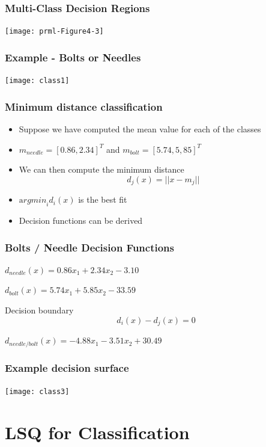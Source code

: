 \documentclass[10pt]{beamer}
\begin{document}
\begin{frame}
  \frametitle{Multi-Class Decision Regions}
  \begin{center}
    \texttt{[image: prml-Figure4-3]}
  \end{center}
\end{frame}


\begin{frame}
  \frametitle{Example - Bolts or Needles}
  \begin{center}
    \texttt{[image: class1]}
  \end{center}
\end{frame}

\begin{frame}
  \frametitle{Minimum distance classification}
  \begin{itemize}
  \item Suppose we have computed the mean value for each of the classes
  \item $m_{needle} = [0.86, 2.34]^T$ and $m_{bolt} = [5.74, 5,85]^T$
  \item We can then compute the minimum distance
    \[ d_j(x) = || x - m_j || \]
  \item ${\mathrm argmin}_i d_i(x)$ is the best fit
  \item Decision functions can be derived
  \end{itemize}
\end{frame}

\begin{frame}
  \frametitle{Bolts / Needle Decision Functions}
  \begin{description}
  \item[Needle] $d_{needle}(x) = 0.86 x_1 + 2.34 x_2 - 3.10 $
  \item[Bolt]   $d_{bolt}(x) = 5.74 x_1 + 5.85 x_2 - 33.59$
  \item Decision boundary
    \[ d_i(x) - d_j(x) = 0 \]
  \item $d_{needle/bolt}(x) = -4.88 x_1 - 3.51 x_2 + 30.49$
  \end{description}
\end{frame}

\begin{frame}
  \frametitle{Example decision surface}
  \begin{center}
    \texttt{[image: class3]}
  \end{center}
\end{frame}



\section{LSQ for Classification}
\end{document}
